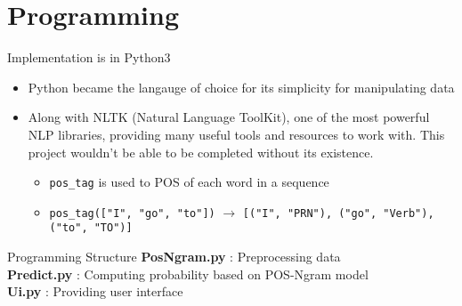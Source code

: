 \documentclass{beamer}
\begin{document}
\section{Programming}

\begin{frame}{Implementation is in Python3}
    \begin{itemize}
        \item Python became the langauge of choice for its simplicity for manipulating data
        \item Along with NLTK (Natural Language ToolKit), one of the most powerful NLP libraries, providing many useful tools and resources to work with. This project wouldn't be able to be completed without its existence.
            \begin{itemize}
                \item \lstinline{pos_tag} is used to POS of each word in a sequence
                \item \lstinline{pos_tag(["I", "go", "to"])} $\rightarrow$ \lstinline{[("I", "PRN"), ("go", "Verb"), ("to", "TO")]}
            \end{itemize}
    \end{itemize}
\end{frame}

\begin{frame}{Programming Structure}
    \textbf{PosNgram.py} : Preprocessing data\\
    \textbf{Predict.py} : Computing probability based on POS-Ngram model\\
    \textbf{Ui.py} : Providing user interface\\
\end{frame}
\end{document}
